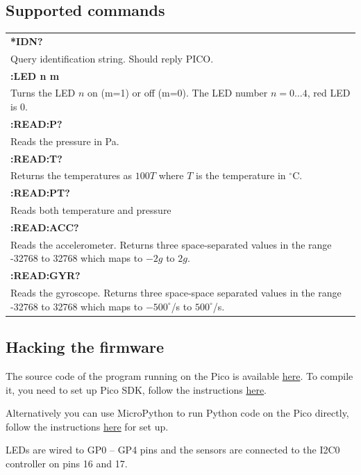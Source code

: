 \documentclass{article}
\begin{document}
\subsection{Supported commands}
\begin{tabular}{p{15cm}}
    \textbf{*IDN?}\\
    Query identification string. Should reply PICO.
    \\\hline
    \textbf{:LED n m}\\
    Turns the LED $n$ on (m=1) or off (m=0). The LED number $n = 0 \dots 4$, red LED is 0.
    \\\hline
    \textbf{:READ:P?}\\
    Reads the pressure in Pa.
    \\\hline
    \textbf{:READ:T?}\\
    Returns the temperatures as $100T$ where $T$ is the temperature in $^\circ$C.
    \\\hline
    \textbf{:READ:PT?}\\
    Reads both temperature and pressure
    \\\hline
    \textbf{:READ:ACC?}\\
    Reads the accelerometer. Returns three space-separated values in the range -32768 to 32768 which maps to $-2g$ to $2g$.
    \\\hline
    \textbf{:READ:GYR?}\\
    Reads the gyroscope. Returns three space-space separated values in the range -32768 to 32768 which maps to $-500^\circ$/s to $500^\circ$/s.
\end{tabular}

\subsection{Hacking the firmware}
The source code of the program running on the Pico is available \href{https://bitbucket.org/emil_varga/picolab/src/master/}{here}. To compile it, you need to set up Pico SDK, follow the instructions \href{https://www.raspberrypi.com/documentation/microcontrollers/c_sdk.html}{here}.

Alternatively you can use MicroPython to run Python code on the Pico directly, follow the instructions \href{https://www.raspberrypi.com/documentation/microcontrollers/micropython.html#what-is-micropython}{here} for set up. 

LEDs are wired to GP0 -- GP4 pins and the sensors are connected to the I2C0 controller on pins 16 and 17.
\end{document}

